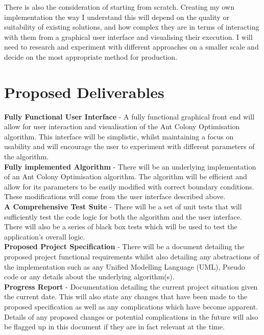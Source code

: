\documentclass[10pt,a4paper]{article}
\begin{document}
There is also the consideration of starting from scratch. Creating my own implementation the way I understand this will depend on the quality or suitability of existing solutions, and how complex they are in terms of interacting with them from a graphical user interface and visualising their execution. I will need to research and experiment with different approaches on a smaller scale and decide on the most appropriate method for production.


\section{Proposed Deliverables}
\textbf{Fully Functional User Interface} - A fully functional graphical front end will allow for user interaction and visualisation of the Ant Colony Optimisation algorithm. This interface will be simplistic, whilst maintaining a focus on usability and will encourage the user to experiment with different parameters of the algorithm. \\

\noindent 
\textbf{Fully implemented Algorithm} - There will be an underlying implementation of an Ant Colony Optimisation algorithm. The algorithm will be efficient and allow for its parameters to be easily modified with correct boundary conditions. These modifications will come from the user interface described above.\\

\noindent
\textbf{A Comprehensive Test Suite} - There will be a set of unit tests that will sufficiently test the code logic for both the algorithm and the user interface. There will also be a series of black box tests which will be used to test the application's overall logic.\\

\noindent
\textbf{Proposed Project Specification} - There will be a document detailing the proposed project functional requirements whilst also detailing any abstractions of the implementation such as any Unified Modelling Language (UML), Pseudo code or any details about the underlying algorithm(s). \\

\noindent
\textbf{Progress Report} - Documentation detailing the current project situation given the current date. This will also state any changes that have been made to the proposed specification as well as any complications which have become apparent. Details of any proposed changes or potential complications in the future will also be flagged up in this document if they are in fact relevant at the time. \\
\end{document}
